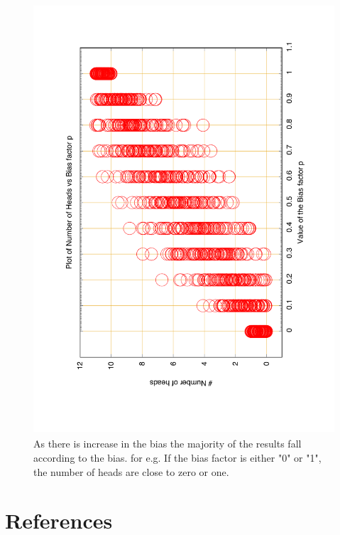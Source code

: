 \documentclass[fleqn,letterpaper,12pt]{report}
\begin{document}
\begin{figure}[ht!]
	\centering
	\includegraphics[height=160mm,width=120mm,angle=-90]{CoinFlip_Multiple.pdf}\caption{As there is increase in the bias the majority of the results fall according to the bias. for e.g. If the bias factor is either "0" or "1", the number of heads are close to zero or one. 
 \label{overflow}}
\end{figure} 
\vfill
%
\newpage
\clearpage
{}
{}
\problem

%

%
\newpage
{}
\section*{References}


\end{document}
